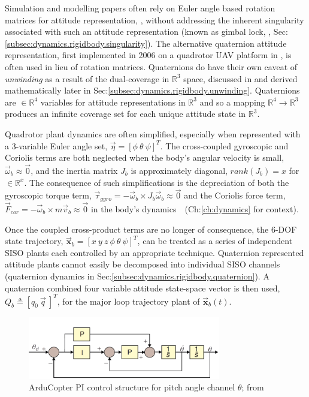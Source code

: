 \par
Simulation and modelling papers often rely on Euler angle based rotation matrices for attitude representation, \cite{adaptivedisturbancecontrol, optimizedpidquadcopter, singleaxistilting, backsteppingquadcoptercontrol, fullquadcoptercontrol}, without addressing the inherent singularity associated with such an attitude representation (known as gimbal lock, \cite{euleranglesingularity}, Sec:\ref{subsec:dynamics.rigidbody.singularity}). The alternative quaternion attitude representation, first implemented in 2006 on a quadrotor UAV platform in \cite{attitudestabilization}, is often used in lieu of rotation matrices. Quaternions do have their own caveat of \emph{unwinding} as a result of the dual-coverage in $\mathbb{R}^3$ space, discussed in \cite{unwinding} and derived mathematically later in Sec:\ref{subsec:dynamics.rigidbody.unwinding}. Quaternions are $\in\mathbb{R}^4$ variables for attitude representations in $\mathbb{R}^3$ and so a mapping $\mathbb{R}^4\rightarrow\mathbb{R}^3$ produces an infinite coverage set for each unique attitude state in $\mathbb{R}^3$.
\par
Quadrotor plant dynamics are often simplified, especially when represented with a 3-variable Euler angle set, $\vec{\eta} = [\phi ~\theta ~\psi]^T$. The cross-coupled gyroscopic and Coriolis terms are both neglected when the body's angular velocity is small, $\vec{\omega}_b \approx \vec{0}$, and the inertia matrix $J_b$ is approximately diagonal, $rank(J_b)= x$ for $\in\mathbb{R}^x$. The consequence of such simplifications is the depreciation of both the gyroscopic torque term, $\vec{\tau}_{gyro}=-\vec{\omega}_b \times J_b\vec{\omega}_b \approx \vec{0}$ and the  Coriolis force term, $\vec{F}_{cor}=-\vec{\omega}_b \times m\vec{v}_b \approx \vec{0}$ in the body's dynamics~~(Ch:\ref{ch:dynamics} for context). 
\par
Once the coupled cross-product terms are no longer of consequence, the 6-DOF state trajectory, $\vec{\mathbf{x}}_b=[x ~y ~z ~\phi ~\theta ~\psi]^T$, can be treated as a series of independent SISO plants each controlled by an appropriate technique. Quaternion represented attitude plants cannot easily be decomposed into individual SISO channels (quaternion dynamics in Sec:\ref{subsec:dynamics.rigidbody.quaternion}). A quaternion combined four variable attitude state-space vector is then used, $Q_b \triangleq [q_0 ~\vec{q}\>]^T$, for the major loop trajectory plant of $\vec{\mathbf{x}}_b(t)$.
\begin{figure}[hbtp]
\vspace{-8pt}
\centering
\includegraphics[width=0.75\textwidth]{figs/arducopter-pi}
\vspace{-2pt}
\caption{ArduCopter PI control structure for pitch angle channel $\theta$; from~\cite{buildyourownquad}}
\label{fig:arducopter-pi}
\vspace{-10pt}
\end{figure}
